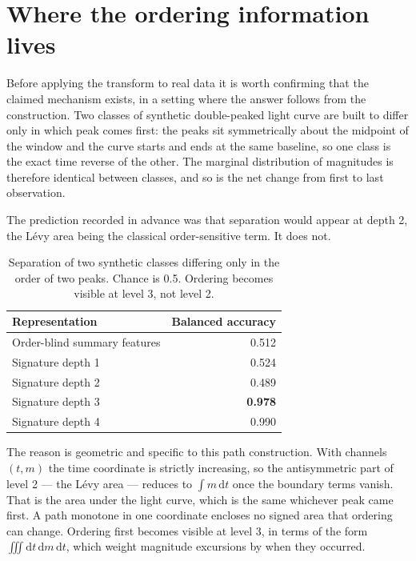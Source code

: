 \documentclass[11pt,a4paper]{report}
\begin{document}
\section{Where the ordering information lives}
\label{sec:order}

Before applying the transform to real data it is worth confirming that the claimed mechanism
exists, in a setting where the answer follows from the construction. Two classes of synthetic
double-peaked light curve are built to differ only in which peak comes first: the peaks sit
symmetrically about the midpoint of the window and the curve starts and ends at the same
baseline, so one class is the exact time reverse of the other. The marginal distribution of
magnitudes is therefore identical between classes, and so is the net change from first to last
observation.

The prediction recorded in advance was that separation would appear at depth 2, the Lévy area
being the classical order-sensitive term. It does not.

\begin{table}[h]
\centering
\small
\begin{tabular}{lr}
\toprule
Representation & Balanced accuracy \\
\midrule
Order-blind summary features & 0.512 \\
Signature depth 1 & 0.524 \\
Signature depth 2 & 0.489 \\
Signature depth 3 & \textbf{0.978} \\
Signature depth 4 & 0.990 \\
\bottomrule
\end{tabular}
\caption{Separation of two synthetic classes differing only in the order of two peaks.
Chance is 0.5. Ordering becomes visible at level 3, not level 2.}
\end{table}

The reason is geometric and specific to this path construction. With channels
$(t, m)$ the time coordinate is strictly increasing, so the antisymmetric part of level 2 ---
the Lévy area --- reduces to $\int m \,\mathrm{d}t$ once the boundary terms vanish. That is the
area under the light curve, which is the same whichever peak came first. A path monotone in one
coordinate encloses no signed area that ordering can change. Ordering first becomes visible at
level 3, in terms of the form $\iiint \mathrm{d}t\,\mathrm{d}m\,\mathrm{d}t$, which weight
magnitude excursions by when they occurred.
\end{document}
